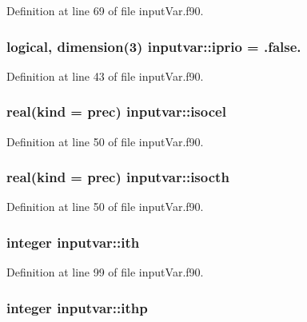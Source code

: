 Definition at line 69 of file input\-Var.\-f90.

\hypertarget{classinputvar_a4bacf572842e302cf317a3cc5e95a9b9}{
\subsubsection[{iprio}]{\setlength{\rightskip}{0pt plus 5cm}logical, dimension(3) inputvar\-::iprio = .false.}}\label{classinputvar_a4bacf572842e302cf317a3cc5e95a9b9}


Definition at line 43 of file input\-Var.\-f90.

\hypertarget{classinputvar_a398c551573b9e71aaae3ba84991c6b81}{
\subsubsection[{isocel}]{\setlength{\rightskip}{0pt plus 5cm}real(kind = prec) inputvar\-::isocel}}\label{classinputvar_a398c551573b9e71aaae3ba84991c6b81}


Definition at line 50 of file input\-Var.\-f90.

\hypertarget{classinputvar_a5f5ab91e72a9ea0ec51d7f621d01108b}{
\subsubsection[{isocth}]{\setlength{\rightskip}{0pt plus 5cm}real(kind = prec) inputvar\-::isocth}}\label{classinputvar_a5f5ab91e72a9ea0ec51d7f621d01108b}


Definition at line 50 of file input\-Var.\-f90.

\hypertarget{classinputvar_a4bba5fd8a8c399940c4b81e4da0cc9ce}{
\subsubsection[{ith}]{\setlength{\rightskip}{0pt plus 5cm}integer inputvar\-::ith}}\label{classinputvar_a4bba5fd8a8c399940c4b81e4da0cc9ce}


Definition at line 99 of file input\-Var.\-f90.

\hypertarget{classinputvar_abb9734f3e3ee40c97881bd03881065c5}{
\subsubsection[{ithp}]{\setlength{\rightskip}{0pt plus 5cm}integer inputvar\-::ithp}}\label{classinputvar_abb9734f3e3ee40c97881bd03881065c5}


